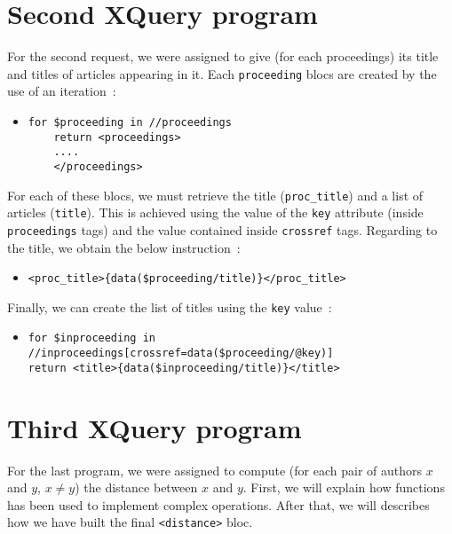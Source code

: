 \documentclass{article}
\begin{document}
\section{Second XQuery program}
  For the second request, we were assigned to give (for each proceedings) its title and titles of articles appearing in it. Each \verb|proceeding| blocs are created by the use of an iteration~:
  \begin{itemize}
    \item \begin{verbatim}
for $proceeding in //proceedings
    return <proceedings>
    ....
    </proceedings>\end{verbatim}
  \end{itemize}
  For each of these blocs, we must retrieve the title (\verb|proc_title|) and a list of articles (\verb|title|). This is achieved using the value of the \verb|key| attribute (inside \verb|proceedings| tags) and the value contained inside \verb|crossref| tags. Regarding to the title, we obtain the below instruction~:
  \begin{itemize}
    \item \verb|<proc_title>{data($proceeding/title)}</proc_title>|
  \end{itemize}
  Finally, we can create the list of titles using the \verb|key| value~:  
  \begin{itemize}
    \item \begin{verbatim}
for $inproceeding in //inproceedings[crossref=data($proceeding/@key)]
return <title>{data($inproceeding/title)}</title>\end{verbatim}
  \end{itemize}
  

\section{Third XQuery program}
  For the last program, we were assigned to compute (for each pair of authors $x$ and $y$, $x \neq y$) the distance between $x$ and $y$. First, we will explain how functions has been used to implement complex operations. After that, we will describes how we have built the final \verb|<distance>| bloc. 
  
\end{document}
